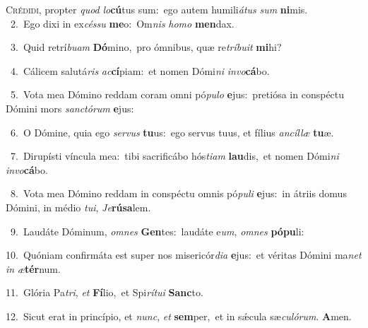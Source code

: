 \lettrine{\initial\textcolor{\initialcolor}{C}}{rédidi,} propter \textit{quod} \textit{lo}\-\textbf{cú}tus sum:~\star ego autem humili\-\textit{á}\-\textit{tus} \textit{sum} \textbf{ni}\-mis.\\
{\numbfont\textcolor{\numbcolor}{~2.}}~Ego dixi in ex\-\textit{cés}\-\textit{su} \textbf{me}\-o:~\star Om\textit{nis} \textit{ho}\-\textit{mo} \textbf{men}\-dax.\par
{\numbfont\textcolor{\numbcolor}{~3.}}~Quid retrí\-\textit{bu}\-\textit{am} \textbf{Dó}\-mino,~\star pro ómnibus, quæ re\-\textit{trí}\-\textit{bu}\textit{it} \textbf{mi}\-hi?\par
{\numbfont\textcolor{\numbcolor}{~4.}}~Cálicem salutá\textit{ris} \textit{ac}\-\textbf{cí}piam:~\star et nomen Dómi\textit{ni} \textit{in}\-\textit{vo}\textbf{cá}bo.\par
{\numbfont\textcolor{\numbcolor}{~5.}}~Vota mea Dómino reddam coram omni pó\-\textit{pu}\-\textit{lo} \textbf{e}\-jus:~\star pretiósa in conspéctu Dómini mors \textit{sanc}\-\textit{tó}\textit{rum} \textbf{e}\-jus:\par
{\numbfont\textcolor{\numbcolor}{~6.}}~O Dómine, quia ego \textit{ser}\-\textit{vus} \textbf{tu}\-us:~\star ego servus tuus, et fílius \textit{an}\-\textit{cíl}\textit{læ} \textbf{tu}\-æ.\par
{\numbfont\textcolor{\numbcolor}{~7.}}~Dirupísti víncula mea:~\dagger tibi sacrificábo hós\-\textit{ti}\-\textit{am} \textbf{lau}\-dis,~\star et nomen Dómi\textit{ni} \textit{in}\-\textit{vo}\textbf{cá}bo.\par
{\numbfont\textcolor{\numbcolor}{~8.}}~Vota mea Dómino reddam in conspéctu omnis pó\-\textit{pu}\-\textit{li} \textbf{e}\-jus:~\star in átriis domus Dómini, in médio \textit{tu}\-\textit{i}, \textit{Je}\-\textbf{rú}\textbf{sa}lem.\par
{\numbfont\textcolor{\numbcolor}{~9.}}~Laudáte Dóminum, \textit{om}\-\textit{nes} \textbf{Gen}\-tes:~\star laudáte e\-\textit{um}\-, \textit{om}\-\textit{nes} \textbf{pó}\-\textbf{pu}li:\par
{\numbfont\textcolor{\numbcolor}{10.}}~Quóniam confirmáta est super nos misericór\-\textit{di}\-\textit{a} \textbf{e}\-jus:~\star et véritas Dómini ma\textit{net} \textit{in} \textit{æ}\-\textbf{tér}num.\par
{\numbfont\textcolor{\numbcolor}{11.}}~Glória Pa\-\textit{tri}\-, \textit{et} \textbf{Fí}\-lio,~\star et Spi\-\textit{rí}\-\textit{tu}\textit{i} \textbf{Sanc}\-to.\par
{\numbfont\textcolor{\numbcolor}{12.}}~Sicut erat in princípio, et \textit{nunc}\-, \textit{et} \textbf{sem}\-per,~\star et in sǽcula sæ\-\textit{cu}\-\textit{ló}\textit{rum}. \textbf{A}\-men.\par
